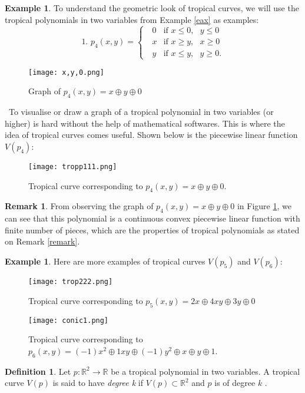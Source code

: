 \documentclass[]{article}
\theoremstyle{definition}
\numberwithin{equation}{section}
\newtheorem{defn}[thm]{Definition}
\newtheorem{examp}[thm]{Example}
\newtheorem{rmk}[thm]{Remark}
\renewcommand{\.}{\,.}
\begin{document}
\begin{examp} To understand the geometric look of tropical curves, we will use the tropical polynomials in two variables from Example \ref{eax} as examples:
		\[\textrm{1. } p_4(x,y) = \begin{cases} 
		\textrm{ }0 & \textrm{if }x\leq 0,\textrm{ }  y\leq 0 \\
		\textrm{ }x & \textrm{if }x\geq y,\textrm{ }  x\geq 0  \\
		\textrm{ }y & \textrm{if }x\leq y,\textrm{ }  y\geq 0. 
	\end{cases}
	\]
	\begin{figure}[H]
		\centering
		\texttt{[image: x,y,0.png]}
		\caption{Graph of $p_4(x,y)=x \oplus y \oplus 0$}
		\label{fig:4} 
	\end{figure}
	\
	 To visualise or draw a graph of a tropical polynomial in two variables (or higher) is hard without the help of mathematical softwares. This is where the idea of tropical curves comes useful. Shown below is the piecewise linear function  $V(p_4)$:
\begin{figure}[H]
	\centering
	\texttt{[image: tropp111.png]}
	\caption{Tropical curve corresponding to $p_4(x,y)=x \oplus y \oplus 0$.}
	\label{fig:5} 
	\end{figure}
\end{examp}
\begin{rmk}
From observing the graph of $p_4(x,y)=x \oplus y \oplus 0$ in Figure \ref{fig:4}, we can see that this polynomial is a continuous convex piecewise linear function with finite number of pieces, which are the properties of tropical polynomials as stated on Remark \ref{remark}.
\end{rmk}
\begin{examp}Here are more examples of tropical curves $V(p_5)$ and $V(p_6)$:
	\begin{figure}[H]
	\centering
	\texttt{[image: trop222.png]}
	\caption{Tropical curve corresponding to $p_5(x,y)=2x \oplus 4xy \oplus 3y \oplus 0$}
	\label{fig:6} 
\end{figure}
\begin{figure}[H]
	\centering
	\texttt{[image: conic1.png]}
	\caption{Tropical curve corresponding to $p_6(x,y)=(-1)x^2 \oplus 1xy \oplus (-1)y^2 \oplus x \oplus y\oplus 1$.}
	\label{fig:7} 
\end{figure}
	\end{examp}
\begin{defn}
	Let $p:\mathbb{R}^2 \to \mathbb{R}$ be a tropical polynomial in two variables. A tropical curve $V(p)$ is said to have \emph{degree k} if $V(p) \subset \mathbb{R}^2$ and $p$ is of degree $k$ . 
\end{defn}
\end{document}
